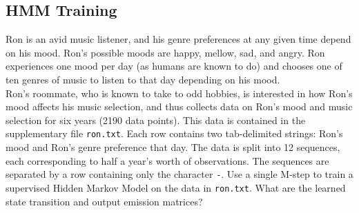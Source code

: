 \documentclass{article}
\begin{document}
\begin{solution}
\begin{center}
\begin{tabular}{ l | l |l | l }
  \end{tabular}
\end{center}
\end{solution}
\newpage

\subsection{HMM Training}
Ron is an avid music listener, and his genre preferences at any given time depend on his mood. Ron's possible moods are happy, mellow, sad, and angry. Ron experiences one mood per day (as humans are known to do) and chooses one of ten genres of music to listen to that day depending on his mood. \\

Ron's roommate, who is known to take to odd hobbies, is interested in how Ron's mood affects his music selection, and thus collects data on Ron's mood and music selection for six years (2190 data points). This data is contained in the supplementary file \texttt{ron.txt}. Each row contains two tab-delimited strings: Ron's mood and Ron's genre preference that day. The data is split into 12 sequences, each corresponding to half a year's worth of observations. The sequences are separated by a row containing only the character \texttt{-}.
\noindent\problem[10] %
Use a single M-step to train a supervised Hidden Markov Model on the data in \texttt{ron.txt}. What are the learned state transition and output emission matrices?
\end{document}
